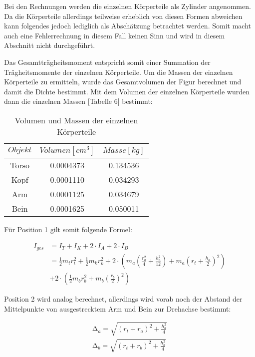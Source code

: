 Bei den Rechnungen werden die einzelnen Körperteile als Zylinder angenommen. Da die Körperteile
allerdings teilweise erheblich von diesen Formen abweichen kann folgendes jedoch lediglich als
Abschätzung betrachtet werden. Somit macht auch eine Fehlerrechnung in diesem Fall keinen Sinn
und wird in diesem Abschnitt nicht durchgeführt.

Das Gesamtträgheitsmoment entspricht somit einer Summation der Trägheitsmomente der einzelnen
Körperteile. Um die Massen der einzelnen Körperteile zu ermitteln, wurde das Gesamtvolumen der
Figur berechnet und damit die Dichte bestimmt. Mit dem Volumen der einzelnen Körperteile wurden
dann die einzelnen Massen [Tabelle 6] bestimmt:

\begin{table}
  \centering
  \caption{Volumen und Massen der einzelnen Körperteile}
  \begin{tabular}{c | c c}
    \toprule $Objekt$ & $Volumen [cm^3]$ & $Masse [kg]$ \\
    \midrule
    Torso & 0.0004373 & 0.134536 \\
    Kopf  & 0.0001110 & 0.034293 \\
    Arm   & 0.0001125 & 0.034679 \\
    Bein  & 0.0001625 & 0.050011 \\
  \end{tabular}
\end{table}

\newpage

Für Position 1 gilt somit folgende Formel:

\begin{align}
  I_{ges} &= I_T + I_K + 2 \cdot I_A + 2 \cdot I_B\\
          &= \frac{1}{2} m_t r_t^2 + \frac{1}{2} m_k r_k^2 + 2 \cdot (m_a(\frac{r_a^2}{4} + \frac{h_a^2}{12}) + m_a(r_t + \frac{h_a}{2})^2) \\
          &+ 2 \cdot (\frac{1}{2} m_b r_b^2 + m_b(\frac{r_b}{2})^2)
\end{align}

Position 2 wird analog berechnet, allerdings wird vorab noch der Abstand der Mittelpunkte von
ausgestrecktem Arm und Bein zur Drehachse bestimmt:

\begin{align}
  \increment_a = \sqrt{(r_t + r_a)^2 + \frac{h_a^2}{4}} \\
  \increment_b = \sqrt{(r_t + r_b)^2 + \frac{h_b^2}{4}}
\end{align}

